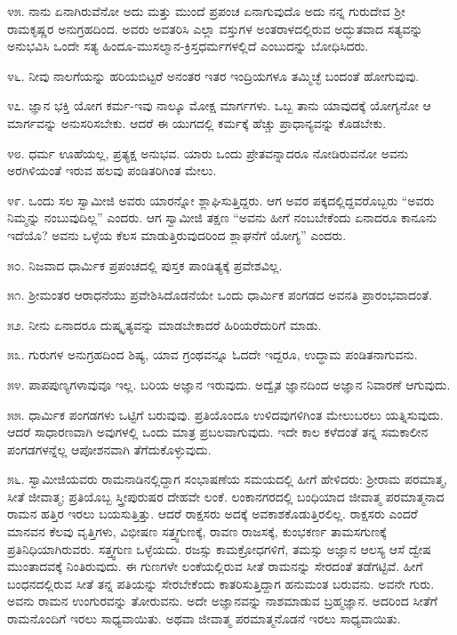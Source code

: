 ೪೫. ನಾನು ಏನಾಗಿರುವೆನೋ ಅದು ಮತ್ತು ಮುಂದೆ ಪ್ರಪಂಚ ಏನಾಗುವುದೊ ಅದು ನನ್ನ ಗುರುದೇವ ಶ‍್ರೀ ರಾಮಕೃಷ್ಣರ ಅನುಗ್ರಹದಿಂದ. ಅವರು ಅವತರಿಸಿ ಎಲ್ಲಾ ವಸ್ತುಗಳ ಅಂತರಾಳದಲ್ಲಿರುವ ಅದ್ಭುತವಾದ ಸತ್ಯವನ್ನು ಅನುಭವಿಸಿ ಒಂದೇ ಸತ್ಯ ಹಿಂದೂ-ಮುಸಲ್ಮಾನ-ಕ್ರಿಸ್ತಧರ್ಮಗಳಲ್ಲಿದೆ ಎಂಬುದನ್ನು ಬೋಧಿಸಿದರು.

೪೬. ನೀವು ನಾಲಗೆಯನ್ನು ಹರಿಯಬಿಟ್ಟರೆ ಅನಂತರ ಇತರ ಇಂದ್ರಿಯಗಳೂ ತಮ್ಮಿಚ್ಛೆ ಬಂದಂತೆ ಹೋಗುವುವು.

೪೭. ಜ್ಞಾನ ಭಕ್ತಿ ಯೋಗ ಕರ್ಮ-ಇವು ನಾಲ್ಕೂ ಮೋಕ್ಷ ಮಾರ್ಗಗಳು. ಒಬ್ಬ ತಾನು ಯಾವುದಕ್ಕೆ ಯೋಗ್ಯನೋ ಆ ಮಾರ್ಗವನ್ನು ಅನುಸರಿಸಬೇಕು. ಆದರೆ ಈ ಯುಗದಲ್ಲಿ ಕರ್ಮಕ್ಕೆ ಹೆಚ್ಚು ಪ್ರಾಧಾನ್ಯವನ್ನು ಕೊಡಬೇಕು.

೪೮. ಧರ್ಮ ಊಹೆಯಲ್ಲ, ಪ್ರತ್ಯಕ್ಷ ಅನುಭವ. ಯಾರು ಒಂದು ಪ್ರೇತವನ್ನಾದರೂ ನೋಡಿರುವನೋ ಅವನು ಅರಗಿಳಿಯಂತೆ ಇರುವ ಹಲವು ಪಂಡಿತರಿಗಿಂತ ಮೇಲು.

೪೯. ಒಂದು ಸಲ ಸ್ವಾಮೀಜಿ ಅವರು ಯಾರನ್ನೋ ಶ್ಲಾಘಿಸುತ್ತಿದ್ದರು. ಆಗ ಅವರ ಪಕ್ಕದಲ್ಲಿದ್ದವರೊಬ್ಬರು “ಅವರು ನಿಮ್ಮನ್ನು ನಂಬುವುದಿಲ್ಲ” ಎಂದರು. ಆಗ ಸ್ವಾಮೀಜಿ ತಕ್ಷಣ “ಅವನು ಹೀಗೆ ನಂಬಬೇಕೆಂದು ಏನಾದರೂ ಕಾನೂನು ಇದೆಯೊ? ಅವನು ಒಳ್ಳೆಯ ಕೆಲಸ ಮಾಡುತ್ತಿರುವುದರಿಂದ ಶ್ಲಾಘನೆಗೆ ಯೋಗ್ಯ” ಎಂದರು.

೫೦. ನಿಜವಾದ ಧಾರ್ಮಿಕ ಪ್ರಪಂಚದಲ್ಲಿ ಪುಸ್ತಕ ಪಾಂಡಿತ್ಯಕ್ಕೆ ಪ್ರವೇಶವಿಲ್ಲ.

೫೧. ಶ‍್ರೀಮಂತರ ಆರಾಧನೆಯು ಪ್ರವೇಶಿಸಿದೊಡನೆಯೇ ಒಂದು ಧಾರ್ಮಿಕ ಪಂಗಡದ ಅವನತಿ ಪ್ರಾರಂಭವಾದಂತೆ.

೫೨. ನೀನು ಏನಾದರೂ ದುಷ್ಕೃತ್ಯವನ್ನು ಮಾಡಬೇಕಾದರೆ ಹಿರಿಯರೆದುರಿಗೆ ಮಾಡು.

೫೩. ಗುರುಗಳ ಅನುಗ್ರಹದಿಂದ ಶಿಷ್ಯ, ಯಾವ ಗ್ರಂಥವನ್ನೂ ಓದದೇ ಇದ್ದರೂ, ಉದ್ಧಾಮ ಪಂಡಿತನಾಗುವನು.

೫೪. ಪಾಪಪುಣ್ಯಗಳಾವುವೂ ಇಲ್ಲ. ಬರಿಯ ಅಜ್ಞಾನ ಇರುವುದು. ಅದ್ವೈತ ಜ್ಞಾನದಿಂದ ಅಜ್ಞಾನ ನಿವಾರಣೆ ಆಗುವುದು.

೫೫. ಧಾರ್ಮಿಕ ಪಂಗಡಗಳು ಒಟ್ಟಿಗೆ ಬರುವುವು. ಪ್ರತಿಯೊಂದೂ ಉಳಿದವುಗಳಿಗಿಂತ ಮೇಲುಬರಲು ಯತ್ನಿಸುವುದು. ಆದರೆ ಸಾಧಾರಣವಾಗಿ ಅವುಗಳಲ್ಲಿ ಒಂದು ಮಾತ್ರ ಪ್ರಬಲವಾಗುವುದು. ಇದೇ ಕಾಲ ಕಳೆದಂತೆ ತನ್ನ ಸಮಕಾಲೀನ ಪಂಗಡಗಳನ್ನೆಲ್ಲ ಆಪೋಶನವಾಗಿ ತೆಗೆದುಕೊಳ್ಳುವುದು.

೫೬. ಸ್ವಾಮೀಜಿಯವರು ರಾಮನಾಡಿನಲ್ಲಿದ್ದಾಗ ಸಂಭಾಷಣೆಯ ಸಮಯದಲ್ಲಿ ಹೀಗೆ ಹೇಳಿದರು: ಶ‍್ರೀರಾಮ ಪರಮಾತ್ಮ, ಸೀತೆ ಜೀವಾತ್ಮ; ಪ್ರತಿಯೊಬ್ಬ ಸ್ತ್ರೀಪುರುಷರ ದೇಹವೇ ಲಂಕೆ. ಲಂಕಾನಗರದಲ್ಲಿ ಬಂಧಿಯಾದ ಜೀವಾತ್ಮ ಪರಮಾತ್ಮನಾದ ರಾಮನ ಹತ್ತಿರ ಇರಲು ಬಯಸುತ್ತಿತ್ತು. ಆದರೆ ರಾಕ್ಷಸರು ಅದಕ್ಕೆ ಅವಕಾಶಕೊಡುತ್ತಿರಲಿಲ್ಲ. ರಾಕ್ಷಸರು ಎಂದರೆ ಮಾನವನ ಕೆಲವು ವೃತ್ತಿಗಳು, ವಿಭೀಷಣ ಸತ್ತ್ವಗುಣಕ್ಕೆ, ರಾವಣ ರಾಜಸಕ್ಕೆ, ಕುಂಭಕರ್ಣ ತಾಮಸಗುಣಕ್ಕೆ ಪ್ರತಿನಿಧಿಯಾಗಿರುವರು. ಸತ್ತ್ವಗುಣ ಒಳ್ಳೆಯದು. ರಜಸ್ಸು ಕಾಮಕ್ರೋಧಗಳಿಗೆ, ತಮಸ್ಸು ಅಜ್ಞಾನ ಆಲಸ್ಯ ಆಸೆ ದ್ವೇಷ ಮುಂತಾದವಕ್ಕೆ ನಿಂತಿರುವುದು. ಈ ಗುಣಗಳೇ ಲಂಕೆಯಲ್ಲಿರುವ ಸೀತೆ ರಾಮನನ್ನು ಸೇರದಂತೆ ತಡೆಗಟ್ಟಿವೆ. ಹೀಗೆ ಬಂಧನದಲ್ಲಿರುವ ಸೀತೆ ತನ್ನ ಪತಿಯನ್ನು ಸೇರಬೇಕೆಂದು ಕಾತರಿಸುತ್ತಿದ್ದಾಗ ಹನುಮಂತ ಬರುವನು. ಅವನೇ ಗುರು. ಅವನು ರಾಮನ ಉಂಗುರವನ್ನು ತೋರುವನು. ಅದೇ ಅಜ್ಞಾನವನ್ನು ನಾಶಮಾಡುವ ಬ್ರಹ್ಮಜ್ಞಾನ. ಅದರಿಂದ ಸೀತೆಗೆ ರಾಮನೊಂದಿಗೆ ಇರಲು ಸಾಧ್ಯವಾಯಿತು. ಅಥವಾ ಜೀವಾತ್ಮ ಪರಮಾತ್ಮನೊಡನೆ ಇರಲು ಸಾಧ್ಯವಾಯಿತು.

